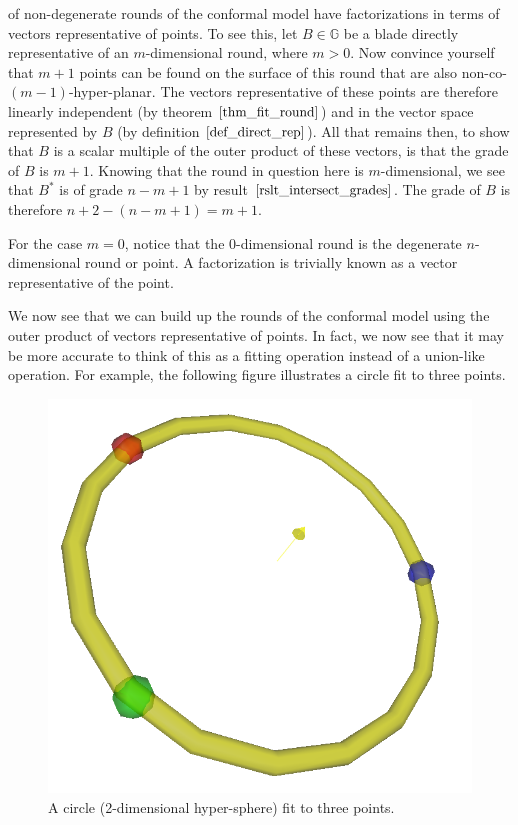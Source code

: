 \documentclass[12pt]{article}
\newcommand{\G}{\mathbb{G}}
\begin{document}
of non-degenerate rounds of the conformal model have factorizations in
terms of vectors representative of points.  To see this, let $B\in\G$ be
a blade directly representative of an $m$-dimensional round, where $m>0$.  Now convince yourself
that $m+1$ points can be found on the surface of this round that are also
non-co-$(m-1)$-hyper-planar.  The vectors representative of these
points are therefore linearly independent (by theorem $\eqref{thm_fit_round}$) and
in the vector space represented by $B$ (by definition $\eqref{def_direct_rep}$).
All that remains then, to show that $B$ is a scalar multiple of the outer product
of these vectors, is that the grade of $B$ is $m+1$.  Knowing that the round in question
here is $m$-dimensional, we see that $B^*$ is of grade $n-m+1$ by result $\eqref{rslt_intersect_grades}$.
The grade of $B$ is therefore $n+2-(n-m+1)=m+1$.

For the case $m=0$, notice that the 0-dimensional round is the degenerate $n$-dimensional round
or point.  A factorization is trivially known as a vector representative of the point.

We now see that we can build up the rounds of the conformal model using
the outer product of vectors representative of points.  In fact, we now see
that it may be more accurate to think of this as a fitting operation instead of
a union-like operation.  For example, the following figure
illustrates a circle fit to three points.
\begin{figure}[H]
\centering
\includegraphics[scale=0.3]{DirectCircleFigure}
\caption{A circle (2-dimensional hyper-sphere) fit to three points.}
\end{figure}
\end{document}
